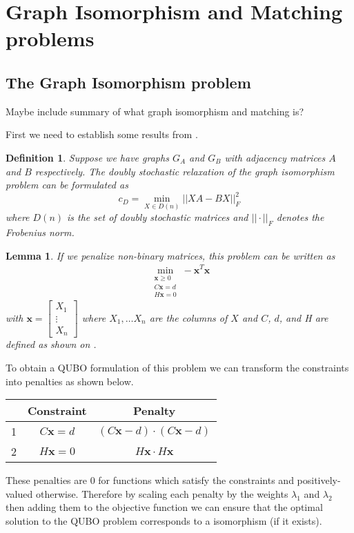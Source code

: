 \documentclass{article}
\newtheorem{lem}[prop]{Lemma}
\newtheorem{defn}[prop]{Definition}
\begin{document}
\newpage

\section{Graph Isomorphism and Matching problems}
\subsection{The Graph Isomorphism problem}
\colorbox{BurntOrange}{Maybe include summary of what graph isomorphism and matching is?}

First we need to establish some results from \autocite{klus2023continuous}.
\begin{defn}\label{def:1}
    \cite[p.~6]{klus2023continuous} Suppose we have graphs \(G_A\) and \(G_B\) with adjacency matrices \(A\) and \(B\) respectively. The doubly stochastic relaxation of the graph isomorphism problem can be formulated as
    \begin{equation*}
        c_D = \min_{X \in D(n)} ||XA - BX||^2_F
    \end{equation*}
    where \(D(n)\) is the set of doubly stochastic matrices and \(||\cdot||_F\) denotes the Frobenius norm.
\end{defn}

\begin{lem}
    \cite[p.~13]{klus2023continuous} If we penalize non-binary matrices, this problem can be written as \begin{align*}
    \min_{\substack{\mathbf{x}\geq 0 \\ C\mathbf{x} = d \\ H\mathbf{x} = 0}} -\mathbf{x}^T \mathbf{x}
    \end{align*}
    with \(\mathbf{x} = \begin{bmatrix}
        X_1 \\
        \vdots \\
        X_n
    \end{bmatrix}\) where \(X_1, \dots X_n\) are the columns of \(X\) and \(C\), \(d\), and H are defined as shown on \cite[p.~8]{klus2023continuous}.
\end{lem}

\noindent To obtain a QUBO formulation of this problem we can transform the constraints into penalties as shown below.
\begin{center}
\begin{tabular}{ |c|c|c| } 
 \hline
   & Constraint  & Penalty \\ 
 \hline
 1 & \(C\mathbf{x} = d\) & \((C\mathbf{x} - d)\cdot(C\mathbf{x} - d)\) \\ 
 2 & \(H\mathbf{x} = 0\) & \(H \mathbf{x} \cdot H \mathbf{x} \) \\ 
 \hline
\end{tabular}
\end{center}
These penalties are 0 for functions which satisfy the constraints and positively-valued otherwise. Therefore by scaling each penalty by the weights \(\lambda_1\) and \(\lambda_2\) then adding them to the objective function we can ensure that the optimal solution to the QUBO problem corresponds to a isomorphism (if it exists).\\
\end{document}
